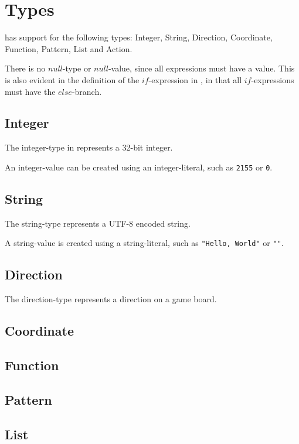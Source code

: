 \section{Types}
\label{sec:types}

\productname{} has support for the following types: Integer, String, Direction, Coordinate,
Function, Pattern, List and Action.

There is no $null$-type or $null$-value, since all expressions must have a value. This
is also evident in the definition of the $if$-expression in , in that
all $if$-expressions must have the $else$-branch.

\subsection{Integer}
The integer-type in \productname{} represents a 32-bit integer.

An integer-value can be created using an integer-literal, such as \texttt{2155} or \texttt{0}.

\subsection{String}
The string-type represents a UTF-8 encoded string.

A string-value is created using a string-literal, such as \texttt{"Hello, World"} or \texttt{""}.

\subsection{Direction}
The direction-type represents a direction on a game board.


\subsection{Coordinate}

\subsection{Function}

\subsection{Pattern}

\subsection{List}

